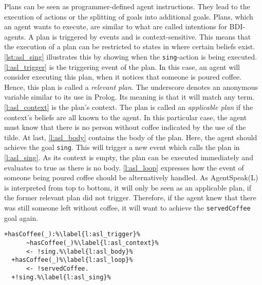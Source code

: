 Plans can be seen as programmer-defined agent instructions. They lead to the execution of actions or the splitting of goals into additional goals. Plans, which an agent wants to execute, are similar to what are called intentions for BDI-agents. A plan is triggered by events and is context-sensitive. This means that the execution of a plan can be restricted to states in where certain beliefs exist. \autoref{lst:asl_sing} illustrates this by showing when the \texttt{sing}-action is being executed. \autoref{l:asl_trigger} is the triggering event of the plan. In this case, an agent will consider executing this plan, when it notices that someone is poured coffee. Hence, this plan is called a \emph{relevant plan}. The underscore denotes an anonymous variable similar to its use in Prolog. Its meaning is that it will match any term. \autoref{l:asl_context} is the plan's context. The plan is called an \emph{applicable plan} if the context's beliefs are all known to the agent. In this particular case, the agent must know that there is no person without coffee indicated by the use of the tilde. At last, \autoref{l:asl_body} contains the body of the plan. Here, the agent should achieve the goal \texttt{sing}. This will trigger a new event which calls the plan in \autoref{l:asl_sing}. As its context is empty, the plan can be executed immediately and evaluates to true as there is no body. \autoref{l:asl_loop} expresses how the event of someone being poured coffee should be alternatively handled. As AgentSpeak(L) is interpreted from top to bottom, it will only be seen as an applicable plan, if the former relevant plan did not trigger. Therefore, if the agent knew that there was still someone left without coffee, it will want to achieve the \texttt{servedCoffee} goal again.
\begin{lstlisting}[firstnumber=4, caption={Events for handling someone being poured a coffee as well as the \texttt{sing} plan.}, label=lst:asl_sing]
  +hasCoffee(_):%\label{l:asl_trigger}%
      ~hasCoffee(_)%\label{l:asl_context}%
      <- !sing.%\label{l:asl_body}%
  +hasCoffee(_)%\label{l:asl_loop}%
      <- !servedCoffee.
  +!sing.%\label{l:asl_sing}%
\end{lstlisting}
